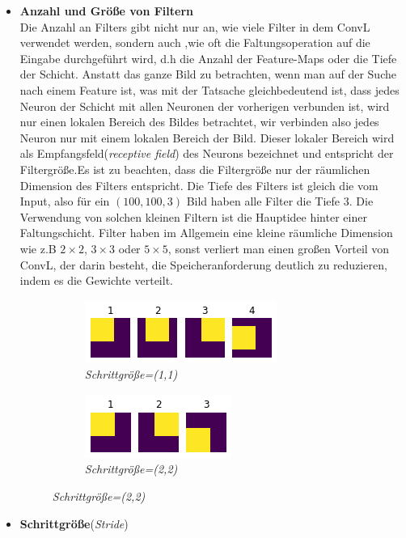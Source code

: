 \documentclass[12pt,a4paper]{scrartcl}
\numberwithin{equation}{section}
\begin{document}
\begin{itemize}
	\item \textbf{Anzahl und Größe von Filtern}\\
	Die Anzahl an Filters gibt nicht nur an, wie viele Filter in dem \ac{ConvL} verwendet werden, sondern auch ,wie oft die Faltungsoperation auf die Eingabe durchgeführt wird, d.h die Anzahl der Feature-Maps oder die Tiefe der Schicht.
	Anstatt das ganze Bild zu betrachten, wenn man auf der Suche nach einem Feature ist, was mit der Tatsache gleichbedeutend ist, dass jedes Neuron der Schicht mit allen Neuronen der vorherigen verbunden ist, wird nur einen lokalen Bereich des Bildes betrachtet, wir verbinden also jedes Neuron nur mit einem lokalen Bereich der Bild. Dieser lokaler Bereich wird als Empfangsfeld(\emph{receptive field}) des Neurons bezeichnet und entspricht der Filtergröße.Es ist zu beachten, dass die Filtergröße nur der räumlichen Dimension des Filters entspricht. Die Tiefe des Filters ist gleich die vom Input, also für ein $ (100, 100, 3) $ Bild haben alle Filter die Tiefe $ 3 $.	
	Die Verwendung von solchen kleinen Filtern ist die Hauptidee hinter einer Faltungschicht. Filter haben im Allgemein eine kleine räumliche Dimension wie z.B $ 2\times 2 $, $3 \times3 $  oder  $5 \times 5$, sonst verliert man einen großen Vorteil von \ac{ConvL}, der darin besteht, die Speicheranforderung deutlich zu reduzieren, indem es die Gewichte verteilt. 
	
	\begin{figure}[h]
		\centering
		\caption{Einfluss der Schrittgröße auf die Größe der Feature-Maps}
		\begin{subfigure}{.5\textwidth}
			\centering
			\includegraphics{stride1}
			\caption{\emph{Schrittgröße=(1,1) } }
			\label{fig:stride1}
		\end{subfigure}%
		\begin{subfigure}{.5\textwidth}
			\centering
			\includegraphics{stride2}
			\caption{ \emph{Schrittgröße=(2,2) } }
			\label{fig:stride2}
		\end{subfigure}
	\end{figure}
	\item  \textbf{Schrittgröße}(\emph{Stride})\\
	

\end{itemize}
\end{document}
